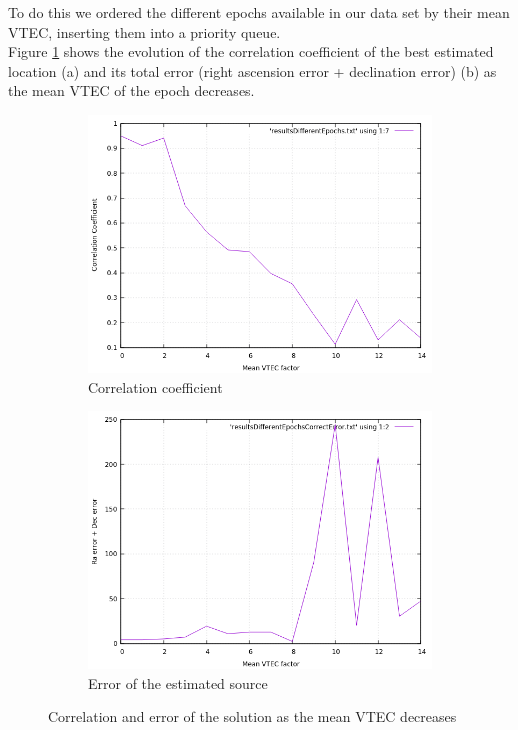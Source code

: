 To do this we ordered the different epochs available in our data set by their mean VTEC, inserting them into a priority queue. \\

Figure \ref{fig:differentEpochs} shows the evolution of the correlation coefficient of the best estimated location (a) and its total error (right ascension error + declination error) (b) as the mean VTEC of the epoch decreases.

\clearpage

\begin{figure}[!htb]
	\begin{subfigure}[b]{0.5\textwidth}
		\includegraphics[width=\linewidth]{images/ch6/spikes/correlationDecrease.png}
		\caption{Correlation coefficient}
	\end{subfigure}
	\hfill
	\begin{subfigure}[b]{0.5\textwidth}
		\includegraphics[width=\linewidth]{images/ch6/spikes/decreaseRangeError.png}
		\caption{Error of the estimated source}
	\end{subfigure}
	\caption{Correlation and error of the solution as the mean VTEC decreases}
	\label{fig:differentEpochs}
\end{figure}

